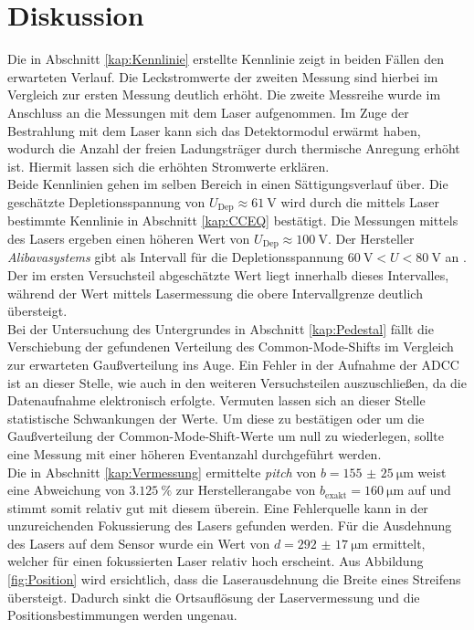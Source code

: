 \section{Diskussion}

Die in Abschnitt \ref{kap:Kennlinie} erstellte Kennlinie zeigt in beiden Fällen den erwarteten Verlauf. Die Leckstromwerte der zweiten Messung sind hierbei im Vergleich zur ersten Messung deutlich erhöht. Die zweite Messreihe wurde im Anschluss an die Messungen mit dem Laser aufgenommen. Im Zuge der Bestrahlung mit dem Laser kann sich das Detektormodul erwärmt haben, wodurch die Anzahl der freien Ladungsträger durch thermische Anregung erhöht ist. Hiermit lassen sich die erhöhten Stromwerte erklären.\\

Beide Kennlinien gehen im selben Bereich in einen Sättigungsverlauf über. Die geschätzte Depletionsspannung von $ U_{\mathrm{Dep}} \approx \SI{61}{\volt}$ wird durch die mittels Laser bestimmte Kennlinie in Abschnitt \ref{kap:CCEQ} bestätigt. Die Messungen mittels des Lasers ergeben einen höheren Wert von $ U_{\mathrm{Dep}} \approx \SI{100}{\volt}$. Der Hersteller \textit{Alibavasystems} gibt als Intervall für die Depletionsspannung $\SI{60}{\volt} < U < \SI{80}{\volt}$ an \cite{alibava}. Der im ersten Versuchsteil abgeschätzte Wert liegt innerhalb dieses Intervalles, während der Wert mittels Lasermessung die obere Intervallgrenze deutlich übersteigt.\\

Bei der Untersuchung des Untergrundes in Abschnitt \ref{kap:Pedestal} fällt die Verschiebung der gefundenen Verteilung des Common-Mode-Shifts im Vergleich zur erwarteten Gaußverteilung ins Auge. Ein Fehler in der Aufnahme der ADCC ist an dieser Stelle, wie auch in den weiteren Versuchsteilen auszuschließen, da die Datenaufnahme elektronisch erfolgte.
Vermuten lassen sich an dieser Stelle statistische Schwankungen der Werte. Um diese zu bestätigen oder um die Gaußverteilung der Common-Mode-Shift-Werte um null zu wiederlegen, sollte eine Messung mit einer höheren Eventanzahl durchgeführt werden.\\

Die in Abschnitt \ref{kap:Vermessung} ermittelte \textit{pitch} von $b = \SI{155(25)}{\micro\metre}$ weist eine Abweichung von $\SI{3.125}{\%}$ zur Herstellerangabe von $b_{\mathrm{exakt}} = \SI{160}{\micro\metre}$ auf \cite{alibava} und stimmt somit relativ gut mit diesem überein. Eine Fehlerquelle kann in der unzureichenden Fokussierung des Lasers gefunden werden. Für die Ausdehnung des Lasers auf dem Sensor wurde ein Wert von $d = \SI{292(17)}{\micro\metre}$ ermittelt, welcher für einen fokussierten Laser relativ hoch erscheint. Aus Abbildung \ref{fig:Position} wird ersichtlich, dass die Laserausdehnung die Breite eines Streifens übersteigt. Dadurch sinkt die Ortsauflösung der Laservermessung und die Positionsbestimmungen werden ungenau.\\

